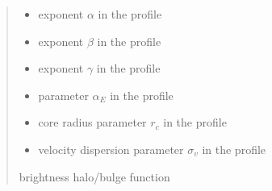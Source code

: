 \documentclass[letterpaper,10pt,english]{sphinxmanual}
\begin{document}
\begin{fulllineitems}
\begin{quote}
\begin{description}
\begin{itemize}
\item {} 
\sphinxAtStartPar
{} \textendash{} exponent \(\alpha\) in the {\hyperref[\detokenize{diffsph.profiles:diffsph.profiles.templates.hdz}]{}} profile

\item {} 
\sphinxAtStartPar
{} \textendash{} exponent \(\beta\) in the {\hyperref[\detokenize{diffsph.profiles:diffsph.profiles.templates.hdz}]{}} profile

\item {} 
\sphinxAtStartPar
{} \textendash{} exponent \(\gamma\) in the {\hyperref[\detokenize{diffsph.profiles:diffsph.profiles.templates.hdz}]{}} profile

\item {} 
\sphinxAtStartPar
{} \textendash{} parameter \(\alpha_E\) in the {\hyperref[\detokenize{diffsph.profiles:diffsph.profiles.templates.enst}]{}} profile

\item {} 
\sphinxAtStartPar
{} \textendash{} core radius parameter \(r_c\) in the {\hyperref[\detokenize{diffsph.profiles:diffsph.profiles.templates.cnfw}]{}} profile

\item {} 
\sphinxAtStartPar
{} \textendash{} velocity dispersion parameter \(\sigma_v\) in the {\hyperref[\detokenize{diffsph.profiles:diffsph.profiles.templates.sis}]{}} profile

\end{itemize}

\sphinxAtStartPar
brightness halo/bulge function

\end{description}\end{quote}

\end{fulllineitems}
\end{document}
